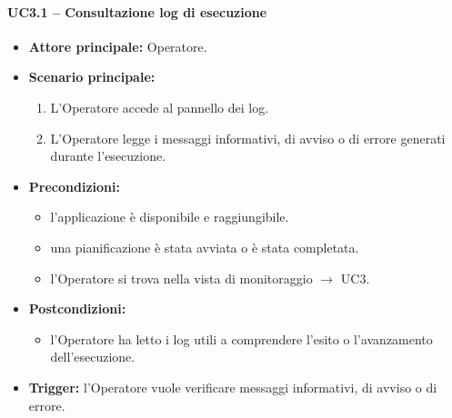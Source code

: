 \paragraph{UC3.1 -- Consultazione log di esecuzione}
\begin{itemize}
    \item \textbf{Attore principale:} Operatore.
    \item \textbf{Scenario principale:}
    \begin{enumerate}
        \item L'Operatore accede al pannello dei log.
        \item L'Operatore legge i messaggi informativi, di avviso o di errore generati durante l'esecuzione.
    \end{enumerate}
    \item \textbf{Precondizioni:}
    \begin{itemize}
        \item l'applicazione è disponibile e raggiungibile.
        \item una pianificazione è stata avviata o è stata completata.
        \item l'Operatore si trova nella vista di monitoraggio $\rightarrow$ UC3.
    \end{itemize}
    \item \textbf{Postcondizioni:}
    \begin{itemize}
        \item l'Operatore ha letto i log utili a comprendere l'esito o l'avanzamento dell'esecuzione.
    \end{itemize}
    \item \textbf{Trigger:} l'Operatore vuole verificare messaggi informativi, di avviso o di errore.
\end{itemize}

